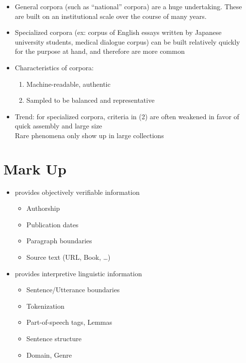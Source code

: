 \documentclass[a4paper,landscape,headrule,footrule,xetex]{foils}
\begin{document}
\begin{itemize}
\item General corpora (such as ``national'' corpora) are a huge undertaking.
These are built on an institutional scale over the course of many years.
\item  Specialized corpora (ex: corpus of English essays written by Japanese
university students, medical dialogue corpus) can be built relatively
quickly for the purpose at hand, and therefore are more common
\item Characteristics of corpora:
  \begin{enumerate}
  \item Machine-readable, authentic
  \item Sampled to be balanced and representative
  \end{enumerate}
\item  Trend: for specialized corpora, criteria in (2) are often weakened in favor of quick assembly and large size 
\\ Rare phenomena only show up in large collections
\end{itemize}


\section{Mark Up}


  \begin{itemize}
  \item {} provides objectively verifiable information
    \begin{itemize}
    \item Authorship
    \item Publication dates
    \item Paragraph boundaries
    \item Source text (URL, Book, \ldots)
    \end{itemize}
  \item {} provides interpretive linguistic information
    \begin{itemize}
    \item Sentence/Utterance boundaries
    \item Tokenization
    \item Part-of-speech tags, Lemmas
    \item Sentence structure
    \item Domain, Genre
    \end{itemize}
  \end{itemize}
\end{document}
